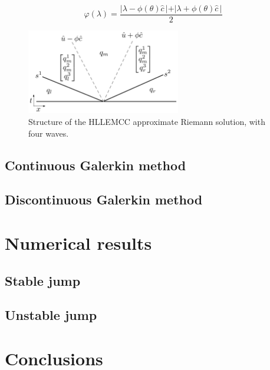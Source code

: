 \documentclass{article}
\begin{document}
\begin{equation}\nonumber
\varphi(\lambda)=\frac{\vert \lambda-\phi(\theta)\hat{c}\,\vert+\vert \lambda+\phi(\theta)\hat{c}\,\vert}{2}
\end{equation}

\begin{figure}
    \center
    \includegraphics[width=0.6\textwidth]{figures/hllemcc.pdf}
    \caption{Structure of the HLLEMCC approximate Riemann solution, with four waves.}
    \label{HLLEMCC}
\end{figure}

\subsection{Continuous Galerkin method}

\subsection{Discontinuous Galerkin method}

\section{Numerical results}

\subsection{Stable jump}

\subsection{Unstable jump}

\section{Conclusions}




\end{document}
